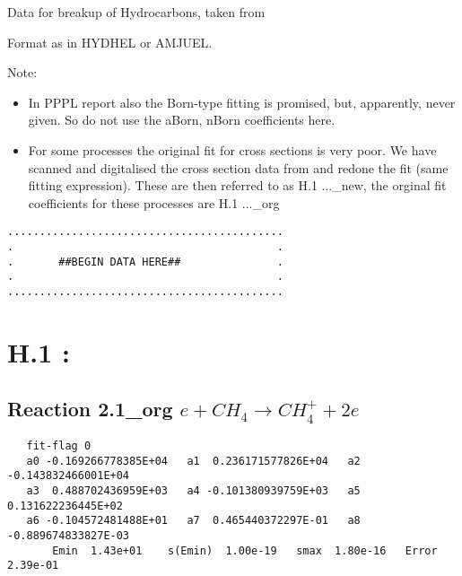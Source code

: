 \documentclass[12pt]{article}
\begin{document}
Data for breakup of Hydrocarbons, taken from
\cite{kn:Ehrhardt}

Format as in HYDHEL \cite{kn:Janev}
or AMJUEL.

Note: 
\begin{itemize}
\item
In PPPL report \cite{kn:Ehrhardt} also the Born-type fitting
is promised, but, apparently, never given.
So do not use the  aBorn, nBorn coefficients here.
\item
For some processes the original fit for cross sections is very poor.
We have scanned and digitalised the cross section data from \cite{kn:Ehrhardt}
and redone the fit (same fitting expression). These are then referred to
as H.1 ...\mbox{\_new}, the orginal fit coefficients for these processes are 
H.1 ...\mbox{\_org}
\end{itemize}

\newpage

\begin{small}\begin{verbatim}
...........................................
.                                         .
.       ##BEGIN DATA HERE##               .
.                                         .
...........................................
\end{verbatim}\end{small}
\newpage
 
\section{H.1 :}
 
\subsection{
Reaction 2.1\mbox{\_org} $e + CH_4 \rightarrow CH_4^+ + 2e$
}
 
\begin{small}\begin{verbatim}
   fit-flag 0
   a0 -0.169266778385E+04   a1  0.236171577826E+04   a2 -0.143832466001E+04
   a3  0.488702436959E+03   a4 -0.101380939759E+03   a5  0.131622236445E+02
   a6 -0.104572481488E+01   a7  0.465440372297E-01   a8 -0.889674833827E-03
       Emin  1.43e+01    s(Emin)  1.00e-19   smax  1.80e-16   Error  2.39e-01
\end{verbatim}\end{small}
\end{document}

